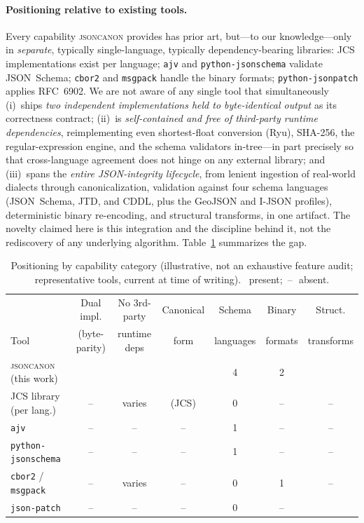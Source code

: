 \documentclass[11pt]{article}
\newcommand{\cmark}{\checkmark}
\newcommand{\xmark}{\,--\,}
\newcommand{\tool}{\textsc{jsoncanon}}
\begin{document}
\paragraph{Positioning relative to existing tools.}\label{sec:positioning}
Every capability \tool{} provides has prior art, but---to our knowledge---only
in \emph{separate}, typically single-language, typically dependency-bearing
libraries: JCS implementations exist per language; \texttt{ajv} and
\texttt{python-jsonschema} validate JSON~Schema; \texttt{cbor2} and
\texttt{msgpack} handle the binary formats; \texttt{python-jsonpatch} applies
RFC~6902. We are not aware of any single tool that simultaneously
(i)~ships \emph{two independent implementations held to byte-identical output}
as its correctness contract; (ii)~is \emph{self-contained and free of
third-party runtime dependencies}, reimplementing even shortest-float conversion
(Ryu), SHA-256, the regular-expression engine, and the schema validators
in-tree---in part precisely so that cross-language agreement does not hinge on
any external library; and (iii)~spans the \emph{entire JSON-integrity lifecycle},
from lenient ingestion of real-world dialects through canonicalization,
validation against four schema languages (JSON~Schema, JTD, and CDDL, plus the
GeoJSON and I-JSON profiles), deterministic binary re-encoding, and structural
transforms, in one artifact. The novelty claimed here is this integration and
the discipline behind it, not the rediscovery of any underlying algorithm.
Table~\ref{tab:comparison} summarizes the gap.

\begin{table}[t]
\centering
\caption{Positioning by capability category (illustrative, not an exhaustive
  feature audit; representative tools, current at time of writing).
  \cmark~present; \xmark~absent.}
\label{tab:comparison}
\small
\begin{tabular}{@{}lcccccc@{}}
\toprule
 & Dual impl. & No 3rd-party & Canonical & Schema & Binary & Struct. \\
Tool & (byte-parity) & runtime deps & form & languages & formats & transforms \\
\midrule
\tool{} (this work)      & \cmark & \cmark & \cmark & 4 & 2 & \cmark \\
JCS library (per lang.)  & \xmark & varies & \cmark (JCS) & 0 & \xmark & \xmark \\
\texttt{ajv}             & \xmark & \xmark & \xmark & 1 & \xmark & \xmark \\
\texttt{python-jsonschema} & \xmark & \xmark & \xmark & 1 & \xmark & \xmark \\
\texttt{cbor2} / \texttt{msgpack} & \xmark & varies & \xmark & 0 & 1 & \xmark \\
\texttt{json-patch}      & \xmark & \xmark & \xmark & 0 & \xmark & \cmark \\
\bottomrule
\end{tabular}
\end{table}
\end{document}
